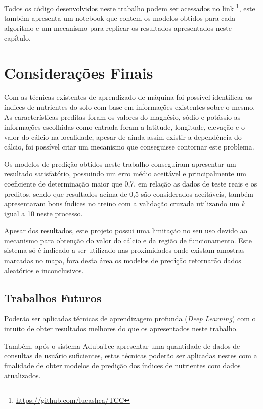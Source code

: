 \documentclass[
12pt,				%
oneside,			%
a4paper,			%
english,			%
french,				%
spanish,			%
brazil				%
]{abntex2}
\begin{document}
Todos os código desenvolvidos neste trabalho podem ser acessados no link \footnote{\href{https://github.com/lucashca/TCC}{https://github.com/lucashca/TCC}}, este também apresenta um notebook que contem os modelos obtidos para cada algoritmo e um mecanismo para replicar os resultados apresentados neste capítulo.

\chapter{Considerações Finais}

Com as técnicas existentes de aprendizado de máquina foi possível identificar os índices de nutrientes do solo com base em informações existentes sobre o mesmo. As características preditas foram os valores do magnésio, sódio e potássio as informações escolhidas como entrada foram a latitude, longitude, elevação e o valor do cálcio na localidade, apesar de ainda assim existir a dependência do cálcio, foi possível criar um mecanismo que conseguisse contornar este problema.

Os modelos de predição obtidos neste trabalho conseguiram apresentar um resultado satisfatório, possuindo um erro médio aceitável e principalmente um coeficiente de determinação maior que 0,7, em relação as dados de teste reais e os preditos, sendo que resultados acima de 0,5 são considerados aceitáveis, também apresentaram bons índices no treino com a validação cruzada utilizando um $k$ igual a 10 neste processo.

Apesar dos resultados, este projeto possui uma limitação no seu uso devido ao mecanismo para obtenção do valor do cálcio e da região de funcionamento. Este sistema só é indicado a ser utilizado nas proximidades onde existam amostras marcadas no mapa, fora desta área os modelos de predição retornarão dados aleatórios e inconclusivos.

\section{Trabalhos Futuros}

Poderão ser aplicadas técnicas de aprendizagem profunda (\textit{Deep Learning}) com o intuito de obter resultados melhores do que os apresentados neste trabalho.

Também, após o sistema AdubaTec apresentar uma quantidade de dados de consultas de usuário suficientes, estas técnicas poderão ser aplicadas nestes com a finalidade de obter modelos de predição dos índices de nutrientes com dados atualizados.
\end{document}
